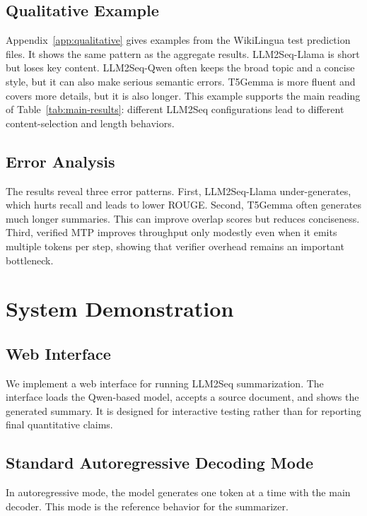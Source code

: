 \documentclass[11pt]{article}
\begin{document}
\subsection{Qualitative Example}

Appendix~\ref{app:qualitative} gives examples from the WikiLingua test prediction files.
It shows the same pattern as the aggregate results.
LLM2Seq-Llama is short but loses key content.
LLM2Seq-Qwen often keeps the broad topic and a concise style, but it can also make serious semantic errors.
T5Gemma is more fluent and covers more details, but it is also longer.
This example supports the main reading of Table~\ref{tab:main-results}: different LLM2Seq configurations lead to different content-selection and length behaviors.

\subsection{Error Analysis}

The results reveal three error patterns.
First, LLM2Seq-Llama under-generates, which hurts recall and leads to lower ROUGE.
Second, T5Gemma often generates much longer summaries.
This can improve overlap scores but reduces conciseness.
Third, verified MTP improves throughput only modestly even when it emits multiple tokens per step, showing that verifier overhead remains an important bottleneck.

\section{System Demonstration}
\label{sec:demo}

\subsection{Web Interface}

We implement a web interface for running LLM2Seq summarization.
The interface loads the Qwen-based model, accepts a source document, and shows the generated summary.
It is designed for interactive testing rather than for reporting final quantitative claims.

\subsection{Standard Autoregressive Decoding Mode}

In autoregressive mode, the model generates one token at a time with the main decoder.
This mode is the reference behavior for the summarizer.
\end{document}
